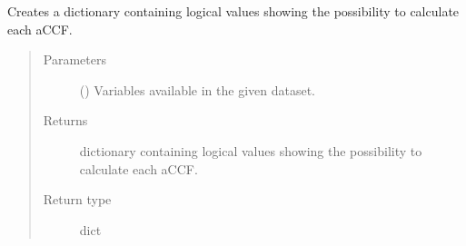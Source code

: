 \documentclass[a4paper,11pt,english]{sphinxmanual}
\begin{document}
\begin{fulllineitems}
\label{\detokenize{modules:envlib.extract_data.logic_cal_accfs}}
Creates a dictionary containing logical values showing the possibility to calculate each aCCF.
\begin{quote}\begin{description}
\item[{Parameters}] \leavevmode
{} () \textendash{} Variables available in the given dataset.

\item[{Returns}] \leavevmode
dictionary containing logical values showing the possibility to calculate each aCCF.

\item[{Return type}] \leavevmode
dict

\end{description}\end{quote}

\end{fulllineitems}

\label{\detokenize{modules:module-envlib.extend_dim}}
\end{document}
